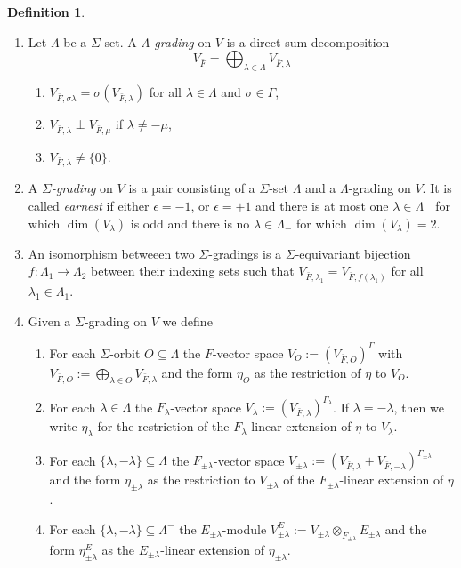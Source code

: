 \documentclass{article}
\theoremstyle{definition}
\newtheorem{dfn}[thm]{Definition}
\numberwithin{equation}{subsection}
\renewcommand{\-}{\hyp{}}
\begin{document}
\begin{dfn} \label{dfn:lambda_grading}
	\begin{enumerate}
		\item 	Let $\Lambda$ be a $\Sigma$-set. A \emph{$\Lambda$-grading} on $V$ is a direct sum decomposition
	\[ V_{\bar F} = \bigoplus_{\lambda \in \Lambda} V_{\bar F,\lambda} \]
	\begin{enumerate}
		\item $V_{\bar F,\sigma\lambda}=\sigma(V_{\bar F,\lambda})$ for all $\lambda \in \Lambda$ and $\sigma \in \Gamma$,
		\item $V_{\bar F,\lambda} \perp V_{\bar F,\mu}$ if $\lambda \neq -\mu$,
		\item $V_{\bar F,\lambda} \neq \{0\}$.
	\end{enumerate}
	\item A \emph{$\Sigma$-grading} on $V$ is a pair consisting of a $\Sigma$-set $\Lambda$ and a $\Lambda$-grading on $V$. It is called \emph{earnest} if either $\epsilon=-1$, or $\epsilon=+1$ and there is at most one $\lambda \in \Lambda_-$ for which $\dim(V_\lambda)$ is odd and there is no $\lambda \in \Lambda_-$ for which $\dim(V_\lambda)=2$.
	\item An isomorphism betweeen two $\Sigma$-gradings is a $\Sigma$-equivariant bijection $f: \Lambda_1 \to \Lambda_2$ between their indexing sets such that $V_{\bar F, \lambda_1}=V_{\bar F, f(\lambda_1)}$ for all $\lambda_1 \in \Lambda_1$.
	\item Given a $\Sigma$-grading on $V$ we define
	\begin{enumerate}
		\item For each $\Sigma$-orbit $O \subseteq \Lambda$ the $F$-vector space $V_O:=(V_{\bar F,O})^\Gamma$ with $V_{\bar F,O}:=\bigoplus_{\lambda \in O} V_{\bar F,\lambda}$ and the form $\eta_O$ as the restriction of $\eta$ to $V_O$.
		\item For each $\lambda \in \Lambda$ the $F_\lambda$-vector space $V_\lambda:=(V_{\bar F,\lambda})^{\Gamma_\lambda}$. If $\lambda=-\lambda$, then we write $\eta_\lambda$ for the restriction of the $F_\lambda$-linear extension of $\eta$ to $V_\lambda$.
		\item For each $\{\lambda,-\lambda\} \subseteq \Lambda$ the $F_{\pm\lambda}$-vector space $V_{\pm\lambda}:=(V_{\bar F,\lambda} + V_{\bar F,-\lambda})^{\Gamma_{\pm\lambda}}$ and the  form $\eta_{\pm\lambda}$ as the restriction to $V_{\pm\lambda}$
		of the $F_{\pm\lambda}$-linear extension of $\eta$. 
\item For each $\{\lambda,-\lambda\} \subseteq \Lambda^-$ the $E_{\pm\lambda}$-module $V_{\pm\lambda}^E := V_{\pm\lambda} \otimes_{F_{\pm\lambda}} E_{\pm\lambda}$ and the form $\eta_{\pm\lambda}^E$ as the $E_{\pm\lambda}$-linear extension of $\eta_{\pm\lambda}$.

\end{enumerate}
\end{enumerate}
\end{dfn}
\end{document}
